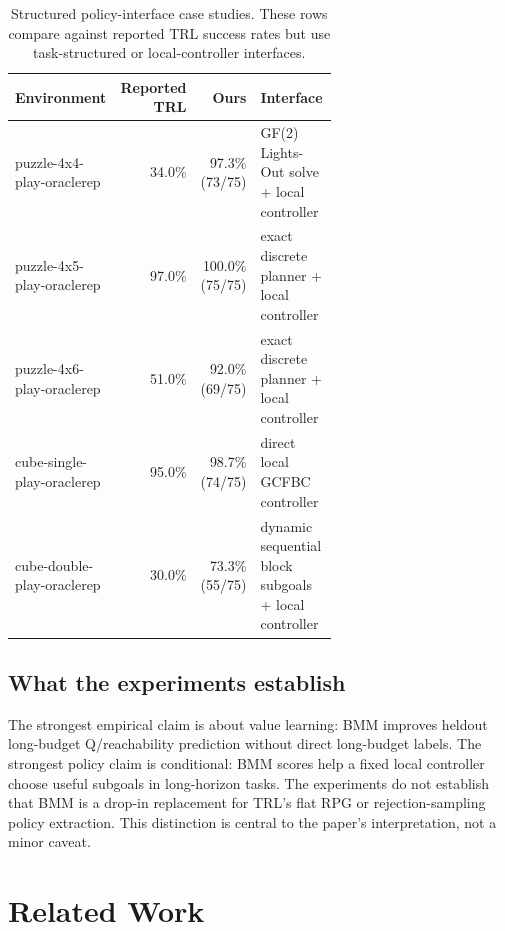\documentclass[11pt]{article}
\begin{document}
\begin{table}[t]
\centering
\small
\caption{Structured policy-interface case studies. These rows compare against reported TRL success rates but use task-structured or local-controller interfaces.}
\label{tab:structured}
\begin{tabular}{L{0.34\linewidth}rrL{0.30\linewidth}}
\toprule
Environment & Reported TRL & Ours & Interface \\
\midrule
puzzle-4x4-play-oraclerep & 34.0\% & 97.3\% (73/75) & GF(2) Lights-Out solve + local controller \\
puzzle-4x5-play-oraclerep & 97.0\% & 100.0\% (75/75) & exact discrete planner + local controller \\
puzzle-4x6-play-oraclerep & 51.0\% & 92.0\% (69/75) & exact discrete planner + local controller \\
cube-single-play-oraclerep & 95.0\% & 98.7\% (74/75) & direct local GCFBC controller \\
cube-double-play-oraclerep & 30.0\% & 73.3\% (55/75) & dynamic sequential block subgoals + local controller \\
\bottomrule
\end{tabular}
\end{table}

\subsection{What the experiments establish}

The strongest empirical claim is about value learning: BMM improves heldout
long-budget Q/reachability prediction without direct long-budget labels. The
strongest policy claim is conditional: BMM scores help a fixed local controller
choose useful subgoals in long-horizon tasks. The experiments do not establish
that BMM is a drop-in replacement for TRL's flat RPG or rejection-sampling policy
extraction. This distinction is central to the paper's interpretation, not a
minor caveat.

\section{Related Work}
\end{document}
